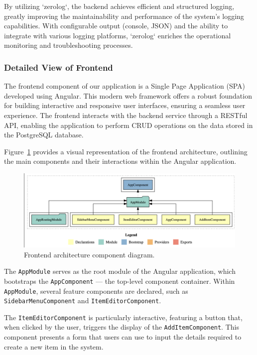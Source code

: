 By utilizing `zerolog`, the backend achieves efficient and structured logging, greatly improving the maintainability and performance of the system's logging capabilities.
With configurable output (console, JSON) and the ability to integrate with various logging platforms, `zerolog` enriches the operational monitoring and troubleshooting processes.


\newpage

\subsubsection{Detailed View of Frontend}
The frontend component of our application is a Single Page Application (SPA) developed using Angular.
This modern web framework offers a robust foundation for building interactive and responsive user interfaces, ensuring a seamless user experience.
The frontend interacts with the backend service through a RESTful API, enabling the application to perform CRUD operations on the data stored in the PostgreSQL database.

Figure~\ref{fig:frontend_architecture} provides a visual representation of the frontend architecture, outlining the main components and their interactions within the Angular application.

\begin{figure}[H]
    \centering
    \includegraphics[width=\textwidth]{images/frontend/frontend_overview_component}
    \caption{Frontend architecture component diagram.}
    \label{fig:frontend_architecture}
\end{figure}

The \texttt{AppModule} serves as the root module of the Angular application, which bootstraps the \texttt{AppComponent} — the top-level component container.
Within \texttt{AppModule}, several feature components are declared, such as \\\texttt{SidebarMenuComponent} and \texttt{ItemEditorComponent}.

The \texttt{ItemEditorComponent} is particularly interactive, featuring a button that, when clicked by the user, triggers the display of the \texttt{AddItemComponent}.
This component presents a form that users can use to input the details required to create a new item in the system.

